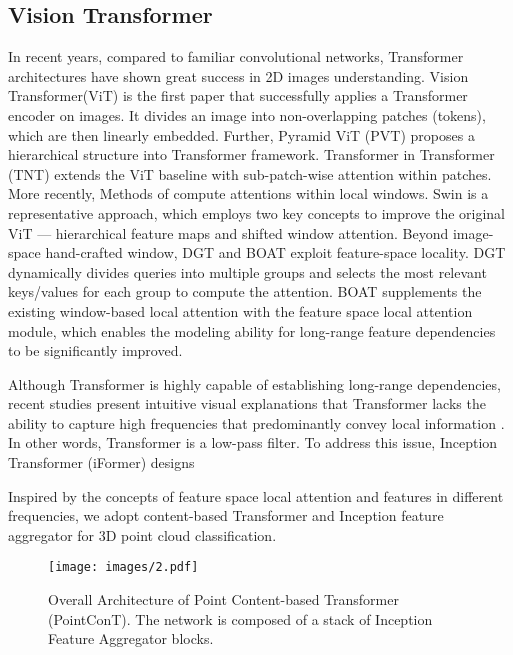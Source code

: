 \documentclass[lettersize,journal]{IEEEtran}
\begin{document}
\subsection{Vision Transformer}
In recent years, compared to familiar convolutional networks, 
Transformer architectures have shown great success in 2D images understanding.
Vision Transformer(ViT)\cite{vit} is the first paper that successfully applies a Transformer encoder on images.
It divides an image into non-overlapping patches (tokens), which are then linearly embedded. 
Further, Pyramid ViT (PVT)\cite{pvtv1,pvtv2} proposes a hierarchical structure into Transformer framework.
Transformer in Transformer (TNT)\cite{tnt} extends the ViT baseline with sub-patch-wise attention within patches. 
More recently, Methods of \cite{swin,cswin,neighborhood,shuffle} compute attentions within local windows.
Swin\cite{swin} is a representative approach, which employs two key concepts to improve the original ViT — hierarchical feature maps and shifted window attention.
Beyond image-space hand-crafted window, DGT\cite{dgt} and BOAT\cite{boat} exploit feature-space locality.
DGT\cite{dgt} dynamically divides queries into multiple groups and 
selects the most relevant keys/values for each group to compute the attention. 
BOAT\cite{boat} supplements the existing window-based local attention with the feature space local attention module,
which enables the modeling ability for long-range feature dependencies to be significantly improved.

Although Transformer is highly capable of establishing long-range dependencies, 
recent studies present intuitive visual explanations that Transformer lacks the ability to capture high frequencies that predominantly convey local information \cite{visvit,iformer}.
In other words, Transformer is a low-pass filter. To address this issue, 
Inception Transformer (iFormer)\cite{iformer} designs  
  
Inspired by the concepts of feature space local attention and features in different frequencies, 
we adopt content-based Transformer and Inception feature aggregator for 3D point cloud classification. 

\begin{figure*}
  \centering
  \texttt{[image: images/2.pdf]}
  \caption{Overall Architecture of Point Content-based Transformer (PointConT). The network is composed of a stack of Inception Feature Aggregator blocks.}
  \label{fig:overall}
\end{figure*}
\end{document}
